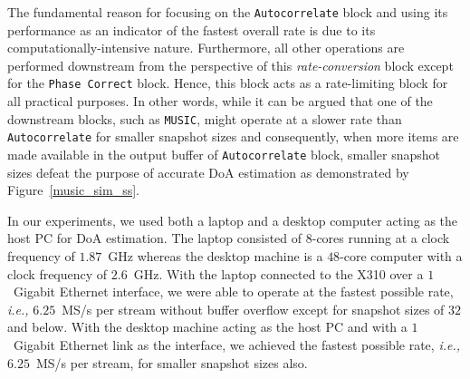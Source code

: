 \documentclass[a4paper, 11pt]{article}
\begin{document}
The fundamental reason for focusing on the \texttt{Autocorrelate} block and using its performance as an indicator of the fastest overall rate is due to its computationally-intensive nature. Furthermore, all other operations are performed downstream from the perspective of this \textit{rate-conversion} block except for the \texttt{Phase Correct} block. Hence, this block acts as a rate-limiting block for all practical purposes. In other words, while it can be argued that one of the downstream blocks, such as \texttt{MUSIC}, might operate at a slower rate than \texttt{Autocorrelate} for smaller snapshot sizes and consequently, when more items are made available in the output buffer of \texttt{Autocorrelate} block, smaller snapshot sizes defeat the purpose of accurate DoA estimation as demonstrated by Figure~\ref{music_sim_ss}.

In our experiments, we used both a laptop and a desktop computer acting as the host PC for DoA estimation. The laptop consisted of $8$-cores running at a clock frequency of $1.87$~GHz whereas the desktop machine is a $48$-core computer with a clock frequency of $2.6$~GHz. With the laptop connected to the X310 over a $1$~Gigabit Ethernet interface, we were able to operate at the fastest possible rate, \textit{i.e.,} $6.25$~MS/s per stream without buffer overflow except for snapshot sizes of $32$ and below. With the desktop machine acting as the host PC and with a $1$~Gigabit Ethernet link as the interface, we achieved the fastest possible rate, \textit{i.e.,} $6.25$~MS/s per stream, for smaller snapshot sizes also. 
\end{document}
